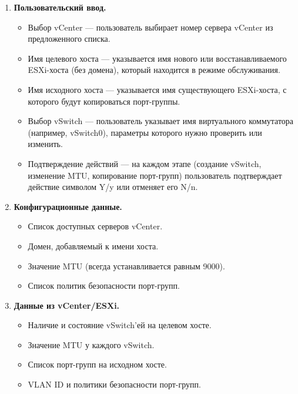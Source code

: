 \begin{enumerate}
    \item \textbf{Пользовательский ввод.}
    \begin{itemize}
        \item Выбор vCenter — пользователь выбирает номер сервера vCenter из предложенного списка.
        \item Имя целевого хоста — указывается имя нового или восстанавливаемого ESXi-хоста (без домена), который находится в режиме обслуживания.
        \item Имя исходного хоста — указывается имя существующего ESXi-хоста, с которого будут копироваться порт-группы.
        \item Выбор vSwitch — пользователь указывает имя виртуального коммутатора (например, vSwitch0), параметры которого нужно проверить или изменить.
        \item Подтверждение действий — на каждом этапе (создание vSwitch, изменение MTU, копирование порт-групп) пользователь подтверждает действие символом Y/y или отменяет его N/n.
    \end{itemize}
    
    \item \textbf{Конфигурационные данные.}
    \begin{itemize}
        \item Список доступных серверов vCenter.
        \item Домен, добавляемый к имени хоста.
        \item Значение MTU (всегда устанавливается равным 9000).
        \item Список политик безопасности порт-групп.
    \end{itemize}
    
    \item \textbf{Данные из vCenter/ESXi.}
    \begin{itemize}
        \item Наличие и состояние vSwitch'ей на целевом хосте.
        \item Значение MTU у каждого vSwitch.
        \item Список порт-групп на исходном хосте.
        \item VLAN ID и политики безопасности порт-групп.
    \end{itemize}
\end{enumerate}

